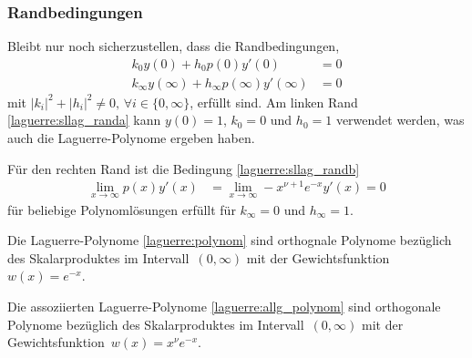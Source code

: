 \subsubsection{Randbedingungen}
Bleibt nur noch sicherzustellen, dass die Randbedingungen,
\begin{align}
k_0 y(0) + h_0 p(0)y'(0)
 & =
0
\label{laguerre:sllag_randa}
\\
k_\infty y(\infty) + h_\infty p(\infty) y'(\infty)
 & =
0
\label{laguerre:sllag_randb}
\end{align}
mit $|k_i|^2 + |h_i|^2 \neq 0,\,\forall i \in \{0, \infty\}$, erfüllt sind.
%
Am linken Rand \eqref{laguerre:sllag_randa} kann $y(0) = 1$, $k_0 = 0$ und
$h_0 = 1$ verwendet werden,
was auch die Laguerre-Polynome ergeben haben.

Für den rechten Rand ist die Bedingung \eqref{laguerre:sllag_randb}
\begin{align*}
\lim_{x \rightarrow \infty} p(x) y'(x)
 & =
\lim_{x \rightarrow \infty} -x^{\nu + 1} e^{-x} y'(x)
=
0
\end{align*}
für beliebige Polynomlösungen erfüllt für $k_\infty=0$ und $h_\infty=1$.

\begin{satz}
Die Laguerre-Polynome %
\eqref{laguerre:polynom}
sind orthognale Polynome bezüglich des Skalarproduktes
im Intervall~$(0, \infty)$ mit der Gewichts\-funktion~$w(x)=e^{-x}$.
\end{satz}

\begin{satz}
Die assoziierten Laguerre-Polynome \eqref{laguerre:allg_polynom}
sind orthogonale Polynome bezüglich des Skalarproduktes 
im Intervall~$(0, \infty)$ mit der Gewichts\-funktion~$w(x)=x^\nu e^{-x}$.
\end{satz}
